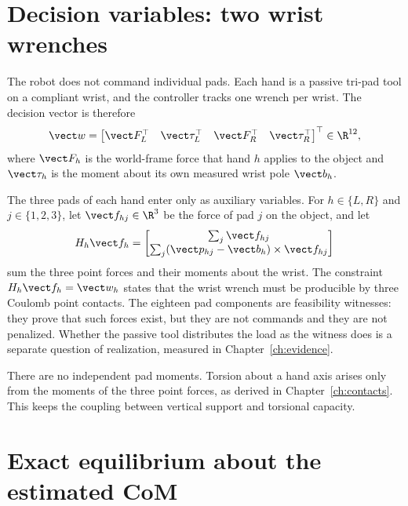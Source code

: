 \section{Decision variables: two wrist wrenches}

The robot does not command individual pads. Each hand is a passive tri-pad tool on a compliant wrist, and the controller tracks one wrench per wrist. The decision vector is therefore
\begin{equation}
\vect w=\begin{bmatrix}\vect F_L^\top&\vect\tau_L^\top&\vect F_R^\top&\vect\tau_R^\top\end{bmatrix}^\top\in\R^{12},
\end{equation}
where $\vect F_h$ is the world-frame force that hand $h$ applies to the object and $\vect\tau_h$ is the moment about its own measured wrist pole $\vect b_h$.

The three pads of each hand enter only as auxiliary variables. For $h\in\{L,R\}$ and $j\in\{1,2,3\}$, let $\vect f_{hj}\in\R^3$ be the force of pad $j$ on the object, and let
\begin{equation}
H_h\vect f_h=\begin{bmatrix}\sum_j\vect f_{hj}\\ \sum_j(\vect p_{hj}-\vect b_h)\times\vect f_{hj}\end{bmatrix}
\label{eq:hand-map}
\end{equation}
sum the three point forces and their moments about the wrist. The constraint $H_h\vect f_h=\vect w_h$ states that the wrist wrench must be producible by three Coulomb point contacts. The eighteen pad components are feasibility witnesses: they prove that such forces exist, but they are not commands and they are not penalized. Whether the passive tool distributes the load as the witness does is a separate question of realization, measured in Chapter~\ref{ch:evidence}.

There are no independent pad moments. Torsion about a hand axis arises only from the moments of the three point forces, as derived in Chapter~\ref{ch:contacts}. This keeps the coupling between vertical support and torsional capacity.

\section{Exact equilibrium about the estimated CoM}

